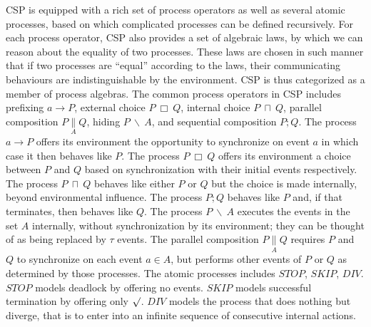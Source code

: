 \documentclass{llncs}
\newcommand{\csppre}[2]{#1 \rightarrow #2}
\newcommand{\cspint}[2]{#1\ \sqcap\ #2}
\newcommand{\cspext}[2]{#1\ \Box\ #2}
\newcommand{\cspseq}[2]{#1; #2}
\newcommand{\csppara}[3]{#1 \underset{#2}{\parallel} #3}
\newcommand{\csphide}[2]{#1\ \backslash\ #2}
\newcommand{\csptick}{\surd}
\newcommand{\csptau}{\tau}
\begin{document}
CSP is equipped with a rich set of process operators as well as several atomic
processes, based on which complicated processes can be defined recursively.
For each process operator, CSP also provides a set of algebraic
laws, by which we can reason about the equality of two processes.
These laws are chosen in such manner that if two processes are ``equal'' according
to the laws, their communicating behaviours are indistinguishable by the
environment. CSP is thus categorized as a member of process algebras. The
common process operators in CSP includes prefixing $\csppre{a}{P}$, external
choice $\cspext{P}{Q}$, internal choice $\cspint{P}{Q}$, parallel composition
$\csppara{P}{A}{Q}$, hiding $\csphide{P}{A}$, and sequential composition
$\cspseq{P}{Q}$. The process $\csppre{a}{P}$ offers its environment
the opportunity to synchronize on event $a$ in which case it
then behaves like $P$. The process $\cspext{P}{Q}$ offers its environment
a choice between $P$ and $Q$ based on synchronization with their initial
events respectively. The process $\cspint{P}{Q}$ behaves like either $P$ or
$Q$ but the choice is made internally, beyond environmental influence. The
process $\cspseq{P}{Q}$ behaves like $P$ and, if that terminates, then
behaves like $Q$. The process $\csphide{P}{A}$ executes the events in the
set $A$ internally, without synchronization by its environment; they can
be thought of as being replaced by $\csptau$ events. The parallel composition
$\csppara{P}{A}{Q}$ requires $P$ and $Q$ to synchronize on each event $a
\in A$, but performs other events of $P$ or $Q$ as determined by those
processes. The atomic processes includes $STOP$, $SKIP$, $DIV$. $STOP$ models
deadlock by offering no events. $SKIP$ models successful termination by
offering only $\csptick$. $DIV$ models the process that does nothing but
diverge, that is to enter into an infinite sequence of consecutive internal actions.
\end{document}

